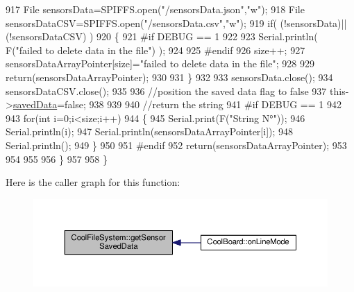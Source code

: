 \begin{DoxyCode}
917         File sensorsData=SPIFFS.open(\textcolor{stringliteral}{"/sensorsData.json"},\textcolor{stringliteral}{"w"});
918         File sensorsDataCSV=SPIFFS.open(\textcolor{stringliteral}{"/sensorsData.csv"},\textcolor{stringliteral}{"w"});
919         \textcolor{keywordflow}{if}( (!sensorsData)||(!sensorsDataCSV) ) 
920         \{
921 \textcolor{preprocessor}{        #if DEBUG == 1}
922     
923             Serial.println( F(\textcolor{stringliteral}{"failed to delete data in the file"}) );
924     
925 \textcolor{preprocessor}{        #endif}
926             size++;
927             sensorsDataArrayPointer[size]=\textcolor{stringliteral}{"failed to delete data in the file"};
928 
929             \textcolor{keywordflow}{return}(sensorsDataArrayPointer);
930 
931         \}
932 
933         sensorsData.close();
934         sensorsDataCSV.close();
935 
936         \textcolor{comment}{//position the saved data flag to false}
937         this->\hyperlink{class_cool_file_system_ad398e0c5c41a0c88acdf5d672aa71351}{savedData}=\textcolor{keyword}{false}; 
938         
939 
940         \textcolor{comment}{//return the string}
941 \textcolor{preprocessor}{        #if DEBUG == 1}
942         
943             \textcolor{keywordflow}{for}(\textcolor{keywordtype}{int} i=0;i<size;i++)
944             \{
945                 Serial.print(F(\textcolor{stringliteral}{"String N°"}));
946                 Serial.println(i);
947                 Serial.println(sensorsDataArrayPointer[i]);
948                 Serial.println();           
949             \}
950     
951 \textcolor{preprocessor}{        #endif}
952         \textcolor{keywordflow}{return}(sensorsDataArrayPointer);
953         
954         
955         
956     \}
957 
958 \}
\end{DoxyCode}
Here is the caller graph for this function\+:\nopagebreak
\begin{figure}[H]
\begin{center}
\leavevmode
\includegraphics[width=350pt]{db/d0c/class_cool_file_system_a3223ffff4266a6300988fab956d6b4b2_icgraph}
\end{center}
\end{figure}
\mbox{\label{class_cool_file_system_a5a7eaeea7a9fbf8aaef651d862fa3b5b}} 
